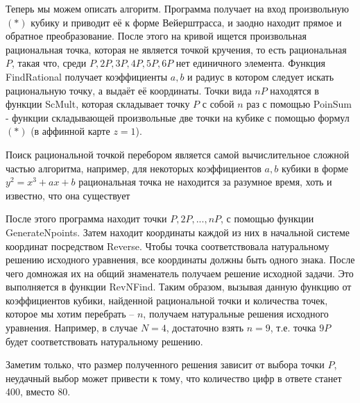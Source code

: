 Теперь мы можем описать алгоритм. Программа получает на вход произвольную
\((*)\) кубику и приводит её к форме Вейерштрасса, и заодно находит прямое и
обратное преобразование. После этого на кривой ищется произвольная
рациональная точка, которая не является точкой кручения, то есть  рациональная
\(P\), такая что, среди \(P, 2P, 3P, 4P, 5P, 6P\) нет единичного элемента.
Функция \textsf{FindRational} получает коэффициенты \(a, b\) и радиус в
котором следует искать рациональную точку,  а выдаёт её координаты. Точки вида
\(nP\) находятся в функции \textsf{ScMult}, которая складывает точку \(P\) с
собой \(n\) раз с помощью \textsf{PoinSum} - функции складывающей произвольные
две точки на кубике с помощью формул  \((*)\) (в аффинной карте \(z = 1\)). 

\begin{remark*}
    Поиск рациональной точкой перебором является самой вычислительное
    сложной частью алгоритма, например, для некоторых коэффициентов \(a, b\) кубики в
    форме \(y^2 = x^3 + ax + b\) рациональная точка не находится за разумное
    время, хоть и известно, что она существует 
\end{remark*}

После этого программа находит точки \(P, 2P, ... , nP\), с помощью функции
\textsf{GenerateNpoints}. Затем находит координаты каждой из них в начальной системе
координат посредством Reverse. Чтобы точка соответствовала натуральному
решению исходного уравнения, все координаты должны быть одного знака. После
чего домножая их на общий знаменатель получаем решение исходной задачи. Это
выполняется в функции \textsf{RevNFind}. Таким образом, вызывая данную функцию от
коэффициентов кубики, найденной рациональной точки и  количества точек,
которое мы хотим перебрать -- \(n\), получаем натуральные решения исходного
уравнения. Например, в случае \(N = 4\), достаточно взять \(n = 9\), т.е.
точка \(9P\) будет соответствовать натуральному решению.
 
Заметим только, что размер полученного решения зависит от выбора точки \(P\),
неудачный выбор может привести к тому, что количество цифр в ответе станет
400, вместо 80.
